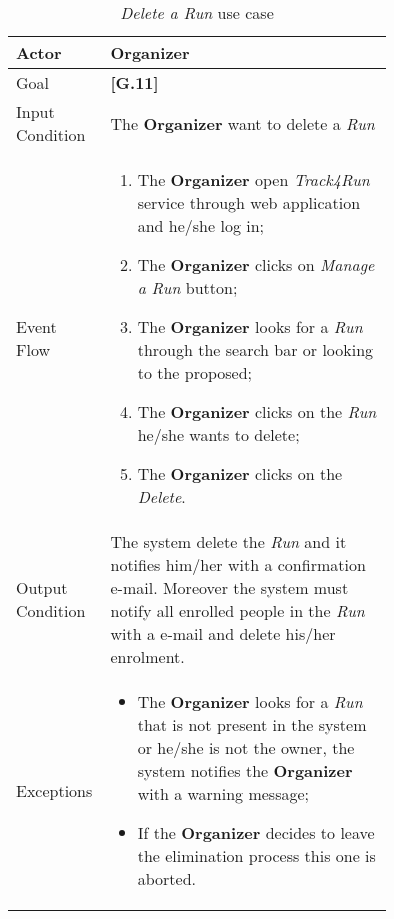 \begin{center}
\begin{table}
\begin{tabular}{ | l | p{0.75\linewidth} | }
  \hline
    Actor & \textbf{Organizer} \\ \hline
    Goal & \textbf{[G.11]} \\ \hline
    Input Condition & The \textbf{Organizer} want to delete a \textit{Run} \\ \hline
    Event Flow & \begin{minipage}[t]{0.7\textwidth}
      \begin{enumerate}
        \item The \textbf{Organizer} open \textit{Track4Run} service through web application and he/she log in;
        \item The \textbf{Organizer} clicks on \textit{Manage a Run} button;
        \item The \textbf{Organizer} looks for a \textit{Run} through the search bar or looking to the proposed;
        \item The \textbf{Organizer} clicks on the \textit{Run} he/she wants to delete;
        \item The \textbf{Organizer} clicks on the \textit{Delete}.
      \end{enumerate}
    \smallskip
  \end{minipage} \\ \hline
  Output Condition & The system delete the \textit{Run} and it notifies him/her with a confirmation e-mail. Moreover the system must notify all enrolled people in the \textit{Run} with a e-mail and delete his/her enrolment. \\ \hline
  Exceptions & \begin{minipage}[t]{0.7\textwidth}
    \begin{itemize}
      \smallskip
      \item The \textbf{Organizer} looks for a \textit{Run} that is not present in the system or he/she is not the owner, the system notifies the \textbf{Organizer} with a warning message;
      \item If the \textbf{Organizer} decides to leave the elimination process this one is aborted.
    \end{itemize}
    \smallskip
  \end{minipage}  \\ \hline
\end{tabular}
\caption{\textit{Delete a Run} use case}
\label{table:deleteRunTable}
\end{table}
\end{center}
